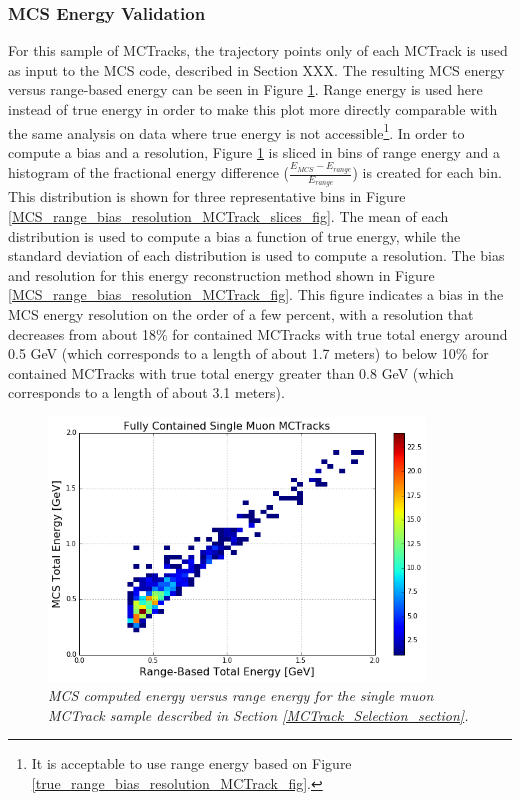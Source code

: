 \subsubsection{MCS Energy Validation}\label{MCS_Energy_Validation_MCTrack_section}
For this sample of {\sc MCTracks}, the trajectory points only of each {\sc MCTrack} is used as input to the MCS code, described in Section XXX. The resulting MCS energy versus range-based energy can be seen in Figure \ref{MCS_range_energy_MCTrack_fig}. Range energy is used here instead of true energy in order to make this plot more directly comparable with the same analysis on data where true energy is not accessible\footnote{It is acceptable to use range energy based on Figure \ref{true_range_bias_resolution_MCTrack_fig}.}. In order to compute a bias and a resolution, Figure \ref{MCS_range_energy_MCTrack_fig} is sliced in bins of range energy and a histogram of the fractional energy difference ($\frac{E_{MCS} - E_{range}}{E_{range}}$) is created for each bin. This distribution is shown for three representative bins in Figure \ref{MCS_range_bias_resolution_MCTrack_slices_fig}. The mean of each distribution is used to compute a bias a function of true energy, while the standard deviation of each distribution is used to compute a resolution. The bias and resolution for this energy reconstruction method shown in Figure \ref{MCS_range_bias_resolution_MCTrack_fig}. This figure indicates a bias in the MCS energy resolution on the order of a few percent, with a resolution that decreases from about 18\% for contained {\sc MCTracks} with true total energy around 0.5 GeV (which corresponds to a length of about 1.7 meters) to below 10\% for contained {\sc MCTracks} with true total energy greater than 0.8 GeV (which corresponds to a length of about 3.1 meters).


\begin{figure}[h!]
\begin{center}
\includegraphics[width=100mm]{Figures/MCS_range_comparison_MCTracks.png}
\end{center}
\caption{\textit{MCS computed energy versus range energy for the single muon {\sc MCTrack} sample described in Section \ref{MCTrack_Selection_section}.}}
\label{MCS_range_energy_MCTrack_fig}
\end{figure}


